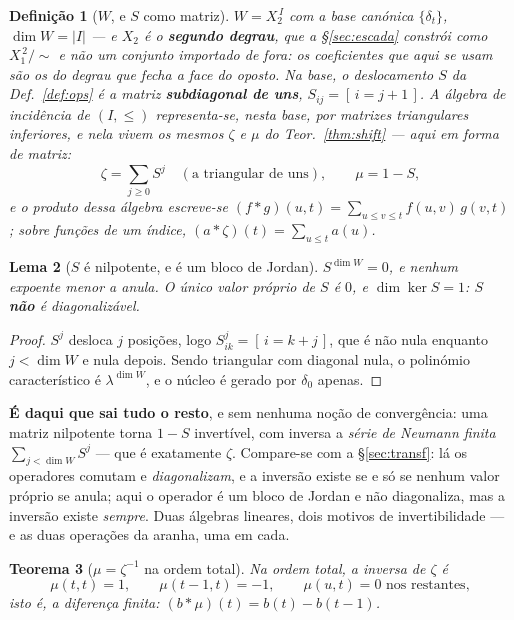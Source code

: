 \documentclass[11pt,a4paper]{article}
\newcommand{\abs}[1]{\lvert #1\rvert}
\newtheorem{teorema}{Teorema}
\newtheorem{lema}[teorema]{Lema}
\newtheorem{definicao}[teorema]{Definição}
\begin{document}
\begin{definicao}[$W$, e $S$ como matriz]\label{def:incid}
$W=X_2^{\,I}$ com a base canónica $\{\delta_t\}$, $\dim W=\abs{I}$ --- e $X_2$ é
o \textbf{segundo degrau}, que a §\ref{sec:escada} constrói como
$X_1^{\,2}/{\sim}$ e não um conjunto importado de fora: os coeficientes que aqui
se usam são os do degrau que fecha a face do \emph{oposto}. Na base, o
deslocamento $S$ da Def.~\ref{def:ops} é a matriz \textbf{subdiagonal de uns},
$S_{ij}=[\,i=j+1\,]$. A álgebra de incidência de $(I,\le)$ representa-se, nesta base, por matrizes
triangulares inferiores, e nela vivem os \emph{mesmos} $\zeta$ e $\mu$ do
Teor.~\ref{thm:shift} --- aqui em forma de matriz:
\[
\zeta=\sum_{j\ge0}S^{j}\quad(\text{a triangular de uns}),\qquad
\mu=1-S ,
\]
e o produto dessa álgebra escreve-se
$(f*g)(u,t)=\sum_{u\le v\le t}f(u,v)\,g(v,t)$; sobre funções de um índice,
$(a*\zeta)(t)=\sum_{u\le t}a(u)$.
\end{definicao}

\begin{lema}[$S$ é nilpotente, e é um bloco de Jordan]\label{lem:nilp}
$S^{\dim W}=0$, e nenhum expoente menor a anula. O único valor próprio de $S$ é
$0$, e $\dim\ker S=1$: $S$ \textbf{não} é diagonalizável.
\end{lema}

\begin{proof}
$S^{j}$ desloca $j$ posições, logo $S^{j}_{ik}=[\,i=k+j\,]$, que é não nula
enquanto $j<\dim W$ e nula depois. Sendo triangular com diagonal nula, o
polinómio característico é $\lambda^{\dim W}$, e o núcleo é gerado por
$\delta_0$ apenas.
\end{proof}

\medskip\noindent\textbf{É daqui que sai tudo o resto}, e sem nenhuma noção de
convergência: uma matriz nilpotente torna $1-S$ invertível, com inversa a
\emph{série de Neumann finita} $\sum_{j<\dim W}S^{j}$ --- que é exatamente
$\zeta$. Compare-se com a §\ref{sec:transf}: lá os operadores comutam e
\emph{diagonalizam}, e a inversão existe se e só se nenhum valor próprio se
anula; aqui o operador é um bloco de Jordan e não diagonaliza, mas a inversão
existe \emph{sempre}. Duas álgebras lineares, dois motivos de invertibilidade ---
e as duas operações da aranha, uma em cada.



\begin{teorema}[$\mu=\zeta^{-1}$ na ordem total]\label{thm:mu}
Na ordem total, a inversa de $\zeta$ é
\[
\mu(t,t)=1,\qquad \mu(t-1,t)=-1,\qquad \mu(u,t)=0 \text{ nos restantes},
\]
isto é, a \emph{diferença finita}: $(b*\mu)(t)=b(t)-b(t-1)$.
\end{teorema}
\end{document}

